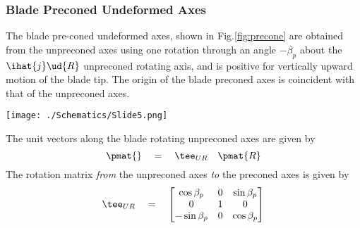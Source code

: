 \subsubsection{Blade Preconed Undeformed Axes} 
\label{sec:bua}
The blade pre-coned undeformed axes, shown in Fig.\ref{fig:precone} are obtained from the unpreconed axes using one rotation through an angle $-\beta_p$ about the $\ihat{j}\ud{R}$ unpreconed rotating axis, and is positive for vertically upward motion of the blade tip. The origin of the blade preconed axes is coincident with that of the unpreconed axes. 
\begin{Figure}
 \centering
 \texttt{[image: ./Schematics/Slide5.png]}
 \vspace{-0.5cm}
 \label{fig:precone}
\end{Figure}
The unit vectors along the blade rotating unpreconed axes are given by
\begin{equation}
\pmat{ } \quad = \quad \tee_{UR} \quad \pmat{R}
\end{equation}
The rotation matrix \emph{from} the unpreconed axes \emph{to} the preconed axes is given by 
\begin{equation}
\label{eqn:TUR}
\tee_{UR} \quad = \quad \begin{bmatrix} \cos \beta_p & 0 & \sin \beta_p \\ 0 & 1 & 0 \\ -\sin \beta_p & 0 & \cos \beta_p\end{bmatrix}
\end{equation}

